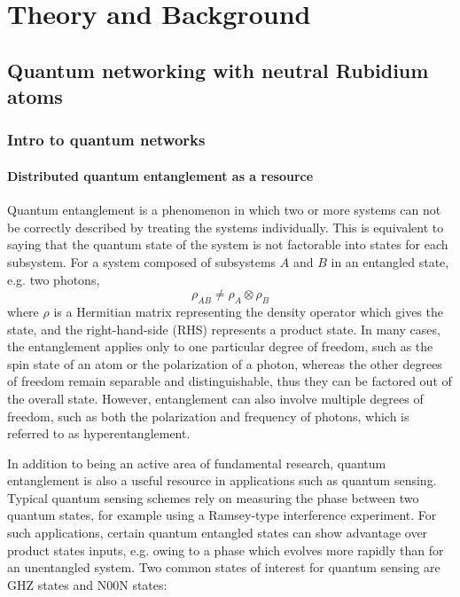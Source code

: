 \part{Theory and Background}\label{part:theory}
\chapter{Quantum networking with neutral Rubidium atoms}\label{ch:intro_to_qn}



\section{Intro to quantum networks}
\subsection{Distributed quantum entanglement as a resource}
Quantum entanglement is a phenomenon in which two or more systems can not be correctly described by treating the systems individually. This is equivalent to saying that the quantum state of the system is not factorable into states for each subsystem. For a system composed of subsystems $A$ and $B$ in an entangled state, e.g. two photons,
\begin{equation}
    \rho_{AB} \neq \rho_A \otimes \rho_B
\end{equation}
where $\rho$ is a Hermitian matrix representing the density operator which gives the state, and the right-hand-side (RHS) represents a product state.
In many cases, the entanglement applies only to one particular degree of freedom, such as the spin state of an atom or the polarization of a photon, whereas the other degrees of freedom remain separable and distinguishable, thus they can be factored out of the overall state. However, entanglement can also involve multiple degrees of freedom, such as both the polarization and frequency of photons, which is referred to as hyperentanglement.

In addition to being an active area of fundamental research, quantum entanglement is also a useful resource in applications such as quantum sensing. Typical quantum sensing schemes rely on measuring the phase between two quantum states, for example using a Ramsey-type interference experiment. For such applications, certain quantum entangled states can show advantage over product states inputs, e.g. owing to a phase which evolves more rapidly than for an unentangled system. Two common states of interest for quantum sensing are GHZ states and N00N states:

